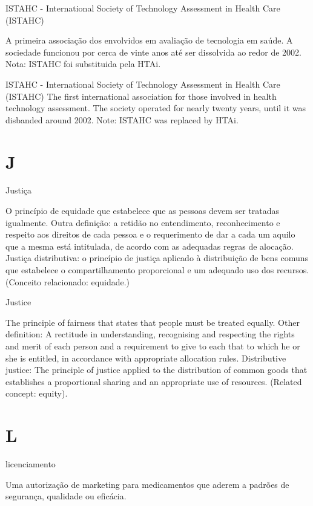 \documentclass[
  openany]{book}
\begin{document}
ISTAHC - International Society of Technology Assessment in Health Care (ISTAHC)

A primeira associação dos envolvidos em avaliação de tecnologia em saúde. A sociedade funcionou por cerca de vinte anos até ser dissolvida ao redor de 2002. Nota: ISTAHC foi substituida pela HTAi.

ISTAHC - International Society of Technology Assessment in Health Care (ISTAHC)
The first international association for those involved in health technology assessment. The society operated for nearly twenty years, until it was disbanded around 2002. Note: ISTAHC was replaced by HTAi.

\hypertarget{j}{%
\chapter*{J}\label{j}}

Justiça

O princípio de equidade que estabelece que as pessoas devem ser tratadas igualmente. Outra definição: a retidão no entendimento, reconhecimento e respeito aos direitos de cada pessoa e o requerimento de dar a cada um aquilo que a mesma está intitulada, de acordo com as adequadas regras de alocação. Justiça distributiva: o princípio de justiça aplicado à distribuição de bens comuns que estabelece o compartilhamento proporcional e um adequado uso dos recursos. (Conceito relacionado: equidade.)

Justice

The principle of fairness that states that people must be treated equally. Other definition: A rectitude in understanding, recognising and respecting the rights and merit of each person and a requirement to give to each that to which he or she is entitled, in accordance with appropriate allocation rules. Distributive justice: The principle of justice applied to the distribution of common goods that establishes a proportional sharing and an appropriate use of resources. (Related concept: equity).

\hypertarget{l}{%
\chapter*{L}\label{l}}

licenciamento

Uma autorização de marketing para medicamentos que aderem a padrões de segurança, qualidade ou eficácia.
\end{document}
